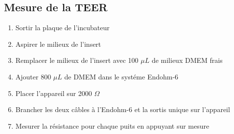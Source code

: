 \subsection{Mesure de la TEER}
\label{TEER}

\begin{enumerate}
\item Sortir la plaque de l'incubateur
\item Aspirer le milieux de l'insert
\item Remplacer le milieux de l'insert avec 100 $\mu L$ de milieux DMEM frais
\item Ajouter 800 $\mu L$ de DMEM dans le systéme Endohm-6
\item Placer l'appareil sur 2000 $\Omega$
\item Brancher les deux câbles à l'Endohm-6 et la sortis unique sur l'appareil
\item Mesurer la résistance pour chaque puits en appuyant sur mesure
\end{enumerate}